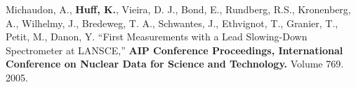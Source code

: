 \documentclass[margin,line]{resume}
\begin{document}
\begin{resume}
\begin{bibenum}
        Michaudon, A., \textbf{Huff, K.}, Vieira, D. J., Bond, E., Rundberg, R.S.,
        Kronenberg, A., Wilhelmy, J., Bredeweg, T. A., Schwantes, J., Ethvignot, T.,
        Granier, T., Petit, M., Danon, Y.
        ``First Measurements with a Lead Slowing-Down Spectrometer at LANSCE,''
        \textbf{AIP Conference Proceedings, International Conference on Nuclear
        Data for Science and Technology.} Volume 769. 2005.
    \end{bibenum}

\end{resume}
\end{document}
